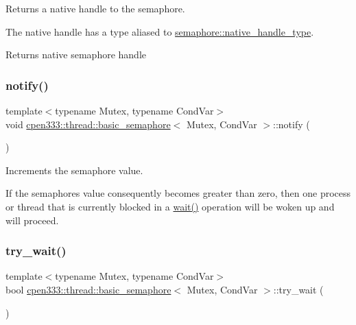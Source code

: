 Returns a native handle to the semaphore. 

The native handle has a type aliased to \hyperlink{classcpen333_1_1thread_1_1basic__semaphore_a22e2293b6882f2bf4312aeb167a0b409}{semaphore\+::native\+\_\+handle\+\_\+type}.

\begin{DoxyReturn}{Returns}
native semaphore handle 
\end{DoxyReturn}
\mbox{\label{classcpen333_1_1thread_1_1basic__semaphore_a0b5032fc8df915cb51276411b1153b84}} 
\subsubsection{\texorpdfstring{notify()}{notify()}}
{\footnotesize\ttfamily template$<$typename Mutex, typename Cond\+Var$>$ \\
void \hyperlink{classcpen333_1_1thread_1_1basic__semaphore}{cpen333\+::thread\+::basic\+\_\+semaphore}$<$ Mutex, Cond\+Var $>$\+::notify (\begin{DoxyParamCaption}{ }\end{DoxyParamCaption})\hspace{0.3cm}{\ttfamily [inline]}}



Increments the semaphore value. 

If the semaphore\textquotesingle{}s value consequently becomes greater than zero, then one process or thread that is currently blocked in a \hyperlink{classcpen333_1_1thread_1_1basic__semaphore_ac5cacef970643d393429ff87c0c6d6bf}{wait()} operation will be woken up and will proceed. \mbox{\label{classcpen333_1_1thread_1_1basic__semaphore_a72eb19243d4c55013f7fca9e5aa059f5}} 
\subsubsection{\texorpdfstring{try\+\_\+wait()}{try\_wait()}}
{\footnotesize\ttfamily template$<$typename Mutex, typename Cond\+Var$>$ \\
bool \hyperlink{classcpen333_1_1thread_1_1basic__semaphore}{cpen333\+::thread\+::basic\+\_\+semaphore}$<$ Mutex, Cond\+Var $>$\+::try\+\_\+wait (\begin{DoxyParamCaption}{ }\end{DoxyParamCaption})\hspace{0.3cm}{\ttfamily [inline]}}



